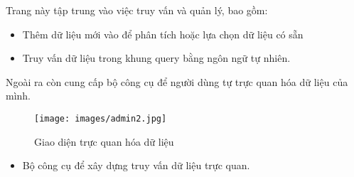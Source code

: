 Trang này tập trung vào việc truy vấn và quản lý, bao gồm:
\begin{itemize}
    \item Thêm dữ liệu   mới vào để phân tích hoặc lựa chọn dữ liệu có sẵn
    \item Truy vấn dữ liệu trong khung query bằng ngôn ngữ tự nhiên.
\end{itemize}

Ngoài ra còn cung cấp bộ công cụ để người dùng tự trực quan hóa dữ liệu của mình.
\begin{figure}[H]
    \centering
    \texttt{[image: images/admin2.jpg]}
    \vspace{0.6cm}
    \caption{Giao diện trực quan hóa dữ liệu}
\end{figure}

\begin{itemize}
    \item Bộ công cụ để xây dựng truy vấn dữ liệu trực quan.
\end{itemize}
